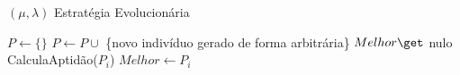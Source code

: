 \begin{algorithm}                      %
	\caption{$( \mu, \lambda )$ Estratégia Evolucionária}          %
	\label{mu_lambda_es}                           %
	\begin{algorithmic}                    %
		\State $P \gets \{\} $
			\State $P \gets P \cup $ \{novo indivíduo gerado de forma arbitrária\}
		\EndFor
		\State $Melhor \get $ nulo
		\Repeat
				CalculaAptidão($P_{i}$)
					$Melhor \gets P_{i}$
				\EndIf
			\EndFor
		\EndProcedure
	\end{algorithmic}
\end{algorithm}